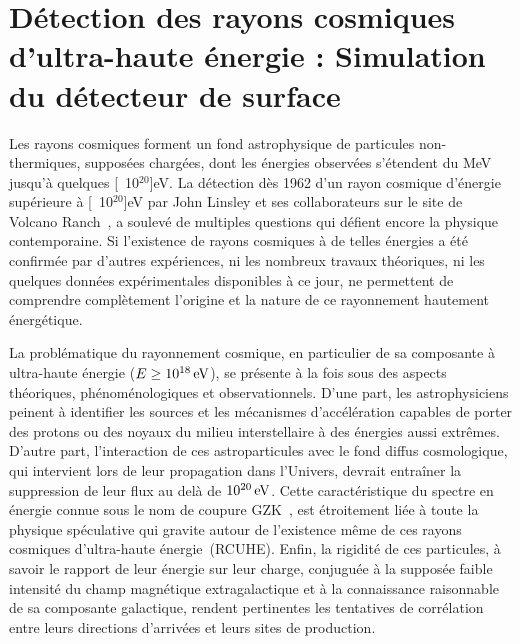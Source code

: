 \documentclass[10pt,a4paper,twoside]{report}
\begin{document}
\renewcommand{\chaptername}{Projet}

\setcounter{chapter}{2}
\chapter{Détection des rayons cosmiques d'ultra-haute énergie :
  Simulation du détecteur de surface}
\label{projet::opa1}

Les rayons cosmiques forment un fond astrophysique de particules
non-thermiques, supposées chargées, dont les énergies observées
s'étendent du MeV jusqu'à quelques \unit[10$^\text{20}$]{eV}. La détection
dès 1962 d'un rayon cosmique d'énergie supérieure à
\unit[10$^\text{20}$]{eV} par John Linsley et ses collaborateurs sur le
site de Volcano Ranch~\cite{linsley}, a soulevé de
multiples questions qui défient encore la physique contemporaine. Si
l'existence de rayons cosmiques à de telles énergies a été confirmée
par d'autres expériences, ni les nombreux travaux théoriques, ni les
quelques données expérimentales disponibles à ce jour, ne permettent
de comprendre complètement l'origine et la nature de ce rayonnement
hautement énergétique.

La problématique du rayonnement cosmique, en particulier de sa
composante à ultra-haute énergie ($E\geq\unit[10^{18}]{eV}$), se
présente à la fois sous des aspects théoriques,
phé\-no\-mé\-no\-lo\-gi\-ques et observationnels. D'une part, les
astrophysiciens peinent à identifier les sources et les mécanismes
d'accélération capables de porter des protons ou des noyaux du milieu
interstellaire à des énergies aussi extrêmes. D'autre part,
l'interaction de ces astroparticules avec le fond diffus cosmologique,
qui intervient lors de leur propagation dans l'Univers, devrait
entraîner la suppression de leur flux au delà de
$\unit[10^{20}]{eV}$. Cette caractéristique du spectre en énergie
connue sous le nom de coupure GZK~\cite{greisen, zatsepin}, est
étroitement liée à toute la physique spéculative qui gravite autour de
l'existence même de ces rayons cosmiques d'ultra-haute
énergie~(RCUHE). Enfin, la rigidité de ces particules, à savoir le
rapport de leur énergie sur leur charge, conjuguée à la supposée
faible intensité du champ magnétique extragalactique et à la
connaissance raisonnable de sa composante galactique, rendent
pertinentes les tentatives de corrélation entre leurs directions
d'arrivées et leurs sites de production.
\end{document}
